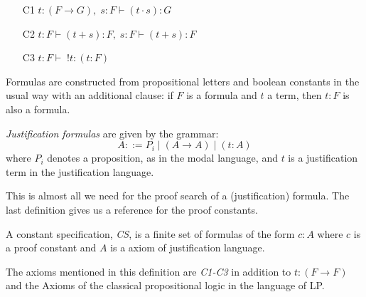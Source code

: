 \begin{rules}\label{rules} 

\begin{itemize} Application, sum and positive introspection respectively.

	\item[C1] $t:(F \rightarrow G), \; s:F \vdash (t \cdot s): G$\label{rule:c1}
	\item[C2] $t:F \vdash (t +s):F, \; s:F \vdash (t+s):F$\label{rule:c2}
	\item[C3] $t:F \vdash \; !t:(t:F)$\label{rule:c3}
\end{itemize}

\end{rules}

Formulas are constructed from propositional letters and boolean constants in the usual way with an additional clause: if $F$ is a formula and $t$ a term, then $t:F$ is also a formula.

\begin{definition}\label{justification_formulas} \emph{Justification formulas} are given by the grammar:
\[
A ::= P_i\;|\;(A \rightarrow A) \;|\; (t:A)
\]
where $P_i$ denotes a proposition, as in the modal language, and $t$ is a justification term in the justification language.
\end{definition}

This is almost all we need for the proof search of a (justification) formula. The last definition gives us a reference for the proof constants.

\begin{definition}\label{cs-def} A constant specification, \emph{CS}, is a finite set of formulas of the form $c:A$ where $c$ is a proof constant and $A$ is a axiom of justification language.
\end{definition}

The axioms mentioned in this definition are \emph{C1-C3} in addition to $t:(F \rightarrow F)$ and the Axioms of the classical propositional logic in the language of LP.

